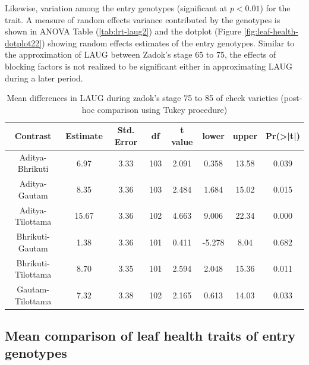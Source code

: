 \documentclass[12pt,oneside]{dukestatscithesis} %
\begin{document}
Likewise, variation among the entry genotypes (significant at \(p < 0.01\)) for the trait. A measure of random effects variance contributed by the genotypes is shown in ANOVA Table (\ref{tab:lrt-laug2}) and the dotplot (Figure \ref{fig:leaf-health-dotplot22}) showing random effects estimates of the entry genotypes. Similar to the approximation of LAUG between Zadok's stage 65 to 75, the effects of blocking factors is not realized to be significant either in approximating LAUG during a later period.
\begin{table}[H]

\caption{\label{tab:leaf-health-meanconf-tab6}Mean differences in LAUG during zadok's stage 75 to 85 of check varieties (post-hoc comparison using Tukey procedure)}
\centering
\begin{tabular}[t]{cccccccc}
\toprule
Contrast & Estimate & Std. Error & df & t value & lower & upper & Pr(>|t|)\\
\midrule
Aditya-Bhrikuti & 6.97 & 3.33 & 103 & 2.091 & 0.358 & 13.58 & 0.039\\
Aditya-Gautam & 8.35 & 3.36 & 103 & 2.484 & 1.684 & 15.02 & 0.015\\
Aditya-Tilottama & 15.67 & 3.36 & 102 & 4.663 & 9.006 & 22.34 & 0.000\\
Bhrikuti-Gautam & 1.38 & 3.36 & 101 & 0.411 & -5.278 & 8.04 & 0.682\\
Bhrikuti-Tilottama & 8.70 & 3.35 & 101 & 2.594 & 2.048 & 15.36 & 0.011\\
Gautam-Tilottama & 7.32 & 3.38 & 102 & 2.165 & 0.613 & 14.03 & 0.033\\
\bottomrule
\end{tabular}
\end{table}
\hypertarget{mean-comparison-of-leaf-health-traits-of-entry-genotypes}{%
\subsection{Mean comparison of leaf health traits of entry genotypes}\label{mean-comparison-of-leaf-health-traits-of-entry-genotypes}}
\end{document}
